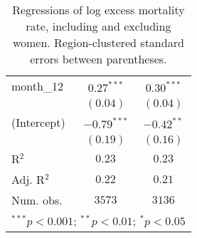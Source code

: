 \begin{table}[h!]
\begin{center}
\begin{small}
\begin{tabular}{l c c}
month\_12      & $0.27^{***}$  & $0.30^{***}$  \\
               & $(0.04)$      & $(0.04)$      \\
(Intercept)    & $-0.79^{***}$ & $-0.42^{**}$  \\
               & $(0.19)$      & $(0.16)$      \\
\hline
R$^2$          & $0.23$        & $0.23$        \\
Adj. R$^2$     & $0.22$        & $0.21$        \\
Num. obs.      & $3573$        & $3136$        \\
\hline
\multicolumn{3}{l}{\tiny{$^{***}p<0.001$; $^{**}p<0.01$; $^{*}p<0.05$}}
\end{tabular}
\end{small}
\caption{Regressions of log excess mortality rate, including and excluding women. Region-clustered standard errors between parentheses.}
\label{tab:nofemmodels}
\end{center}
\end{table}
